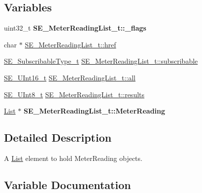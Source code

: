 \subsection*{Variables}
\begin{DoxyCompactItemize}
\item 
\mbox{\label{group__MeterReadingList_ga701e859e3fe72f2b265efd60b4a7898e}} 
uint32\+\_\+t {\bfseries S\+E\+\_\+\+Meter\+Reading\+List\+\_\+t\+::\+\_\+flags}
\item 
char $\ast$ \hyperlink{group__MeterReadingList_ga9844ad12c7c11e9daaf78abd11948bd3}{S\+E\+\_\+\+Meter\+Reading\+List\+\_\+t\+::href}
\item 
\hyperlink{group__SubscribableType_ga5c41f553d369710ed34619266bf2551e}{S\+E\+\_\+\+Subscribable\+Type\+\_\+t} \hyperlink{group__MeterReadingList_gaa6c784a3bde1acd210ee5d07f3b7ea78}{S\+E\+\_\+\+Meter\+Reading\+List\+\_\+t\+::subscribable}
\item 
\hyperlink{group__UInt16_gac68d541f189538bfd30cfaa712d20d29}{S\+E\+\_\+\+U\+Int16\+\_\+t} \hyperlink{group__MeterReadingList_ga1df1d199c933bf4041cf48a30b078075}{S\+E\+\_\+\+Meter\+Reading\+List\+\_\+t\+::all}
\item 
\hyperlink{group__UInt8_gaf7c365a1acfe204e3a67c16ed44572f5}{S\+E\+\_\+\+U\+Int8\+\_\+t} \hyperlink{group__MeterReadingList_gaa8caed66ab18310024f727817493b458}{S\+E\+\_\+\+Meter\+Reading\+List\+\_\+t\+::results}
\item 
\mbox{\label{group__MeterReadingList_gaec084ba2584a2882f1703f99f10859ca}} 
\hyperlink{structList}{List} $\ast$ {\bfseries S\+E\+\_\+\+Meter\+Reading\+List\+\_\+t\+::\+Meter\+Reading}
\end{DoxyCompactItemize}


\subsection{Detailed Description}
A \hyperlink{structList}{List} element to hold Meter\+Reading objects. 

\subsection{Variable Documentation}
\mbox{\label{group__MeterReadingList_ga1df1d199c933bf4041cf48a30b078075}} 
